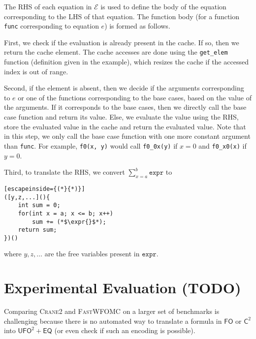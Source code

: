 \documentclass{article}
\theoremstyle{definition}
\newcommand{\expr}{\mathtt{expr}}
\newcommand{\Ctwo}{$\mathsf{C}^{2}$}
\newcommand{\FO}{$\mathsf{FO}$}
\newcommand{\UFO}{$\mathsf{UFO}^{2} + \mathsf{EQ}$}
\newcommand{\Cranetwo}{\textsc{Crane2}}
\begin{document}
The RHS of each equation in $\mathcal{E}$ is used to define the body of the
equation corresponding to the LHS of that equation. The function body (for a
function \texttt{func} corresponding to equation $e$) is formed as follows.

First, we check if the evaluation is already present in the cache. If so, then
we return the cache element. The cache accesses are done using the
\texttt{get\_elem} function (definition given in the example), which resizes the
cache if the accessed index is out of range.

Second, if the element is absent, then we decide if the arguments corresponding
to $e$ or one of the functions corresponding to the base cases, based on the
value of the arguments. If it corresponds to the base cases, then we directly
call the base case function and return its value. Else, we evaluate the value
using the RHS, store the evaluated value in the cache and return the evaluated
value. Note that in this step, we only call the base case function with one more
constant argument than \texttt{func}. For example, \texttt{f0(x, y)} would call
\texttt{f0\_0x(y)} if $x = 0$ and \texttt{f0\_x0(x)} if $y = 0$.

Third, to translate the RHS, we convert $\sum_{x=a}^{b} \expr{}$ to
\begin{lstlisting}[escapeinside={(*}{*)}]
([y,z,...](){
    int sum = 0;
    for(int x = a; x <= b; x++)
        sum += (*$\expr{}$*);
    return sum;
})()
\end{lstlisting}
where $y, z, \dots$ are the free variables present in $\expr{}$.

\section{Experimental Evaluation (TODO)}

Comparing \Cranetwo{} and \textsc{FastWFOMC} on a larger set of benchmarks is
challenging because there is no automated way to translate a formula in \FO{} or
\Ctwo{} into \UFO{} (or even check if such an encoding is possible).
\end{document}
